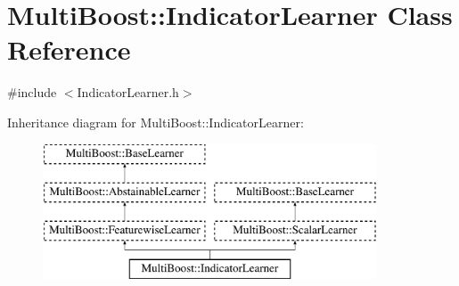 \hypertarget{classMultiBoost_1_1IndicatorLearner}{
\section{MultiBoost::IndicatorLearner Class Reference}
\label{classMultiBoost_1_1IndicatorLearner}
}


{\ttfamily \#include $<$IndicatorLearner.h$>$}

Inheritance diagram for MultiBoost::IndicatorLearner:\begin{figure}[H]
\begin{center}
\leavevmode
\includegraphics[height=4.000000cm]{classMultiBoost_1_1IndicatorLearner}
\end{center}
\end{figure}
